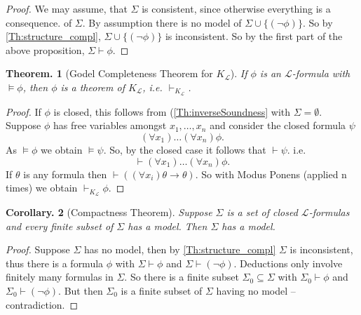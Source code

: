 \documentclass[a4paper,oneside,11pt,DIV=12,parskip=half]{scrartcl}
\newcommand{\LL}{\mathcal L}
\theoremstyle{plain}
\newtheorem{theorem}{Theorem.}[section]
\newtheorem{corollary}[theorem]{Corollary.}
\theoremstyle{definition}
\newtheorem{remark, definition}[theorem]{Remark and Definition.}
\newtheorem{lemma, definition}[theorem]{Lemma and Definition.}
\newtheorem{theorem, definition}[theorem]{Theorem and Definition.}
\theoremstyle{remark}
\newtheorem*{remark, example}{\textbf{Remark and Exercise}}
\begin{document}
\begin{proof}
We may assume, that $\Sigma$ is consistent, since otherwise everything is a consequence. of $\Sigma$.
By assumption there is no model of $\Sigma \cup \{(\lnot \phi) \}$. So by \ref{Th:structure_compl}, $\Sigma \cup \{ (\lnot \phi) \}$ is inconsistent. So by the first part of the above proposition, $\Sigma \vdash \phi$.
\end{proof}

\begin{theorem}[Godel Completeness Theorem for $K_{\LL}$]
If $\phi$ is an $\LL$-formula with $\vDash \phi$, then $\phi$ is a theorem of $K_{\LL}$, i.e. $\vdash_{K_\LL}$.
\end{theorem}

\begin{proof}
If $\phi$ is closed, this follows from (\ref{Th:inverseSoundness} with $\Sigma = \emptyset$.
Suppose $\phi$ has free variables amongst $x_1,\dots,x_n$ and consider the closed formula $\psi$ 
    \[ (\forall x_1)\dots(\forall x_n) \phi. \]
As $\vDash \phi$ we obtain $\vDash \psi$.
So, by the closed case it follows that $\vdash \psi$. i.e. 
    \[ \vdash (\forall x_1)\dots(\forall x_n) \phi.\]
If $\theta$ is any formula then $\vdash ((\forall x_i)\theta \rightarrow \theta)$.
So with Modus Ponens (applied n times) we obtain $\vdash_{K_\LL} \phi$.
\end{proof}

\begin{corollary}[Compactness Theorem]\label{Th:Compactness}
Suppose $\Sigma$ is a set of closed $\LL$-formulas and every finite subset of $\Sigma$ has a model. Then $\Sigma$ has a model.
\end{corollary}

\begin{proof}
Suppose $\Sigma$ has no model, then by \ref{Th:structure_compl} $\Sigma$ is inconsistent, thus there is a formula $\phi$ with $\Sigma \vdash \phi$ and $\Sigma \vdash (\lnot \phi)$.
Deductions only involve finitely many formulas in $\Sigma$. So there is a finite subset $\Sigma_0 \subseteq \Sigma$ with $\Sigma_0 \vdash \phi$ and $\Sigma_0 \vdash (\lnot \phi)$. But then $\Sigma_0$ is a finite subset of $\Sigma$ having no model -- contradiction.
\end{proof}
\end{document}
